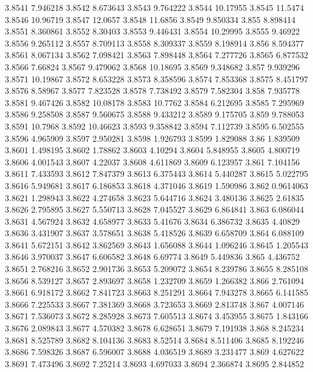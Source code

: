 3.8541  7.946218
3.8542  8.673643
3.8543  9.764222
3.8544  10.17955
3.8545  11.5474
3.8546  10.96719
3.8547  12.0657
3.8548  11.6856
3.8549  9.850334
3.855  8.898414
3.8551  8.360861
3.8552  8.30403
3.8553  9.446431
3.8554  10.29995
3.8555  9.46922
3.8556  9.265112
3.8557  8.709113
3.8558  8.309337
3.8559  8.198914
3.856  8.594377
3.8561  8.067134
3.8562  7.098421
3.8563  7.898448
3.8564  7.277726
3.8565  6.877532
3.8566  7.66824
3.8567  9.479062
3.8568  10.18695
3.8569  9.348682
3.857  9.939296
3.8571  10.19867
3.8572  8.653228
3.8573  8.358596
3.8574  7.853368
3.8575  8.451797
3.8576  8.58967
3.8577  7.823528
3.8578  7.738492
3.8579  7.582304
3.858  7.935778
3.8581  9.467426
3.8582  10.08178
3.8583  10.7762
3.8584  6.212695
3.8585  7.295969
3.8586  9.258508
3.8587  9.560675
3.8588  9.433212
3.8589  9.175705
3.859  9.788053
3.8591  10.7968
3.8592  10.46623
3.8593  9.358842
3.8594  7.112739
3.8595  6.502555
3.8596  4.965909
3.8597  2.950281
3.8598  1.926793
3.8599  1.829088
3.86  1.839509
3.8601  1.498195
3.8602  1.78862
3.8603  4.10294
3.8604  5.848955
3.8605  4.800719
3.8606  4.001543
3.8607  4.22037
3.8608  4.611869
3.8609  6.123957
3.861  7.104156
3.8611  7.433593
3.8612  7.847379
3.8613  6.375443
3.8614  5.440287
3.8615  5.022795
3.8616  5.949681
3.8617  6.186853
3.8618  4.371046
3.8619  1.590986
3.862  0.9614063
3.8621  1.298943
3.8622  4.274658
3.8623  5.644716
3.8624  3.480136
3.8625  2.61835
3.8626  2.795895
3.8627  5.550713
3.8628  7.045527
3.8629  6.864841
3.863  6.086044
3.8631  4.567924
3.8632  4.658977
3.8633  5.41676
3.8634  6.386732
3.8635  4.40829
3.8636  3.431907
3.8637  3.578651
3.8638  5.418526
3.8639  6.658709
3.864  6.088109
3.8641  5.672151
3.8642  3.862569
3.8643  1.656088
3.8644  1.096246
3.8645  1.205543
3.8646  3.970037
3.8647  6.606582
3.8648  6.69774
3.8649  5.449836
3.865  4.436752
3.8651  2.768216
3.8652  2.901736
3.8653  5.209072
3.8654  8.239786
3.8655  8.285108
3.8656  8.539127
3.8657  2.893697
3.8658  1.232709
3.8659  1.266382
3.866  2.761094
3.8661  6.918172
3.8662  7.841723
3.8663  8.251291
3.8664  7.943278
3.8665  6.141585
3.8666  7.225533
3.8667  7.381369
3.8668  3.723653
3.8669  2.813748
3.867  4.007146
3.8671  7.536073
3.8672  8.285928
3.8673  7.605513
3.8674  3.453955
3.8675  1.843166
3.8676  2.089843
3.8677  4.570382
3.8678  6.628651
3.8679  7.191938
3.868  8.245234
3.8681  8.525789
3.8682  8.104136
3.8683  8.52514
3.8684  8.511406
3.8685  8.192246
3.8686  7.598326
3.8687  6.596007
3.8688  4.036519
3.8689  3.231477
3.869  4.627622
3.8691  7.473496
3.8692  7.25214
3.8693  4.697033
3.8694  2.366874
3.8695  2.844852
